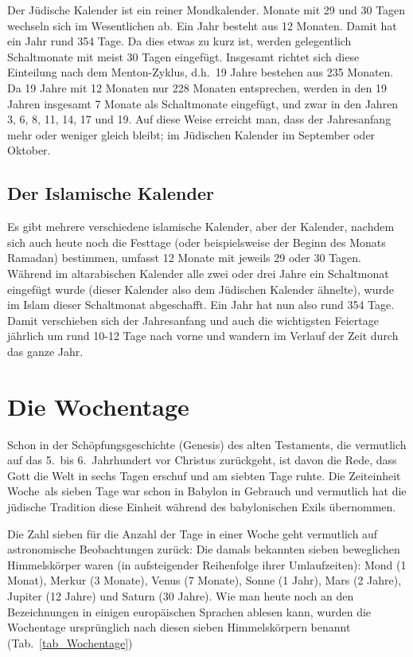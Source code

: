Der J\"udische Kalender
ist ein reiner Mondkalender. Monate mit 29 und 30 Tagen wechseln sich im
Wesentlichen ab. Ein Jahr besteht aus 12 Monaten. Damit hat ein Jahr rund 354 Tage. Da dies etwas zu
kurz ist, werden gelegentlich Schaltmonate 
mit meist 30 Tagen eingef\"ugt. Insgesamt richtet sich diese
Einteilung nach dem Menton-Zyklus, d.h.\ 19 Jahre bestehen aus 235 Monaten. Da 19 Jahre mit 12 Monaten
nur 228 Monaten entsprechen, werden in den 19 Jahren insgesamt 7 Monate als Schaltmonate eingef\"ugt, 
und zwar in den Jahren 3, 6, 8, 11, 14, 17 und 19. Auf diese Weise erreicht man, dass der Jahresanfang
mehr oder weniger gleich bleibt; im J\"udischen Kalender im September oder Oktober. 

\subsection{Der Islamische Kalender}

Es gibt mehrere 
verschiedene islamische Kalender, aber der Kalender, nachdem sich auch heute noch
die Festtage (oder beispielsweise der Beginn des Monats Ramadan) bestimmen, umfasst 12 Monate
mit jeweils 29 oder 30 Tagen. W\"ahrend im altarabischen Kalender alle zwei oder drei Jahre ein Schaltmonat
eingef\"ugt wurde (dieser Kalender also dem J\"udischen Kalender \"ahnelte), wurde im Islam dieser Schaltmonat
abgeschafft. Ein Jahr hat nun also rund 354 Tage. Damit verschieben sich der Jahresanfang und auch die
wichtigsten Feiertage j\"ahrlich um rund 10-12 Tage nach vorne und wandern im Verlauf der Zeit durch das
ganze Jahr. 

\section{Die Wochentage}

Schon in der Sch\"opfungsgeschichte (Genesis) des alten Testaments, die vermutlich auf das 5.\ bis 6.\ Jahrhundert
vor Christus zur\"uckgeht, ist davon die Rede, dass Gott die Welt in sechs Tagen erschuf und am siebten
Tage ruhte. 
Die Zeiteinheit \glqq Woche\grqq\ als sieben Tage war schon in Babylon in Gebrauch und
vermutlich hat die j\"udische Tradition diese Einheit w\"ahrend des babylonischen Exils
\"ubernommen. 

Die Zahl sieben f\"ur die Anzahl der Tage in einer Woche geht vermutlich auf astronomische 
Beobachtungen zur\"uck: Die damals bekannten sieben beweglichen Himmelsk\"orper waren
(in aufsteigender Reihenfolge ihrer Umlaufzeiten): Mond (1 Monat), Merkur (3 Monate), Venus (7 Monate),
Sonne (1 Jahr), Mars (2 Jahre), Jupiter (12 Jahre) und Saturn (30 Jahre). Wie man heute noch an
den Bezeichnungen in einigen europ\"aischen Sprachen ablesen kann, wurden die 
Wochentage
urspr\"unglich nach diesen sieben Himmelsk\"orpern benannt (Tab.\ \ref{tab_Wochentage})

